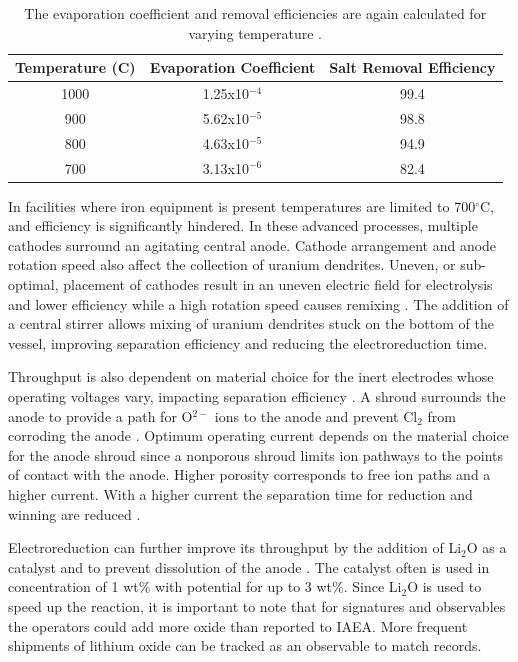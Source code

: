 \documentclass{anstrans}
\begin{document}
\begin{table}[h]
	\centering
	\begin{tabularx}{0.5\textwidth}{ccc}
		\hline
		\textbf{Temperature (C)} & \textbf{Evaporation Coefficient} & \textbf{Salt Removal Efficiency} \\
		\hline
		1000 & 1.25x10$^{-4}$ & 99.4 \\
		900 & 5.62x10$^{-5}$ & 98.8 \\
		800 & 4.63x10$^{-5}$ & 94.9 \\
		700 & 3.13x10$^{-6}$ & 82.4 \\
		\hline
	\end{tabularx}
	\caption {The evaporation coefficient and removal efficiencies are again calculated for varying temperature \cite{lee_advanced_nodate}.}
	\label {tab:temperature}
\end{table}

In facilities where iron equipment is present temperatures are limited to 700$^{\circ}$C, and efficiency is significantly 
hindered. In these advanced processes, multiple cathodes surround an agitating central anode. Cathode arrangement and anode 
rotation speed also affect the collection of uranium dendrites. Uneven, or sub-optimal, placement of cathodes result in an 
uneven electric field for electrolysis and lower efficiency while a high rotation speed causes remixing \cite{lee_advanced_nodate}. 
The addition of a central stirrer allows mixing of uranium dendrites stuck on the bottom of the vessel, improving separation 
efficiency and reducing the electroreduction time. 

Throughput is also dependent on material choice for the inert electrodes whose operating voltages vary, impacting separation 
efficiency \cite{koyama_development_2012}. A shroud surrounds the anode to provide a path for O$^{2-}$ ions to the anode and 
prevent Cl$_2$ from corroding the anode \cite{kim_development_2013,choi_electrochemical_2015}. Optimum operating current 
depends on the material choice for the anode shroud since a nonporous shroud limits ion pathways to the points of contact 
with the anode. Higher porosity corresponds to free ion paths and a higher current. With a higher current the separation 
time for reduction and winning are reduced \cite{choi_electrochemical_2015}. 


Electroreduction can further improve its throughput by the addition of Li$_2$O as a catalyst and to prevent dissolution 
of the anode \cite{choi_electrochemical_2015}. The catalyst often is used in concentration of 1 wt\% with potential for 
up to 3 wt\%. Since Li$_2$O is used to speed up the reaction, it is important to note that for signatures and observables 
the operators could add more oxide than reported to IAEA. More frequent shipments of lithium oxide can be tracked as an 
observable to match records.
\end{document}

